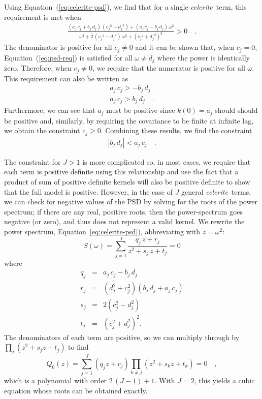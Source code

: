 \documentclass[manuscript, letterpaper]{aastex6}
\newcommand{\celeriteterm}{\emph{celerite}}
\renewcommand{\eqref}[1]{\ref{eq:#1}}
\newcommand{\Eq}[1]{Equation~(\eqref{#1})}
\newcommand{\eq}[1]{\Eq{#1}}
\newcommand{\eqalt}[1]{Equation~\eqref{#1}}
\newcommand{\eqlabel}[1]{\label{eq:#1}}
\newcommand{\response}[1]{{\color{blue}#1}}
\begin{document}
Using \eq{celerite-psd}, we find that for a single \celeriteterm\ term, this
requirement is met when
\begin{eqnarray}\eqlabel{psd-req}
\frac{(a_j\,c_j+b_j\,d_j)\,({c_j}^2+{d_j}^2)+(a_j\,c_j-b_j\,d_j)\,\omega^2}
{\omega^4+2\,({c_j}^2-{d_j}^2)\,\omega^2+{({c_j}^2+{d_j}^2)}^2} > 0 \quad.
\end{eqnarray}
The denominator is positive for all $c_j \ne 0$ and it can be shown that, when
$c_j=0$, \eq{psd-req} is satisfied for all $\omega \ne d_j$ where the power is
identically zero.
Therefore, when $c_j \ne 0$, we require that the numerator is positive for all
$\omega$.
This requirement can also be written as
\begin{eqnarray}
a_j\,c_j > -b_j\,d_j \\
a_j\,c_j > b_j\,d_j \quad.
\end{eqnarray}
Furthermore, we can see that $a_j$ must be positive since $k(0) = a_j$ should
should be positive and, similarly, by requiring the covariance to be finite at
infinite lag, we obtain the constraint $c_j \ge 0$.
Combining these results, we find the constraint
\begin{eqnarray}
    |b_j\,d_j| < a_j\,c_j \quad.
\end{eqnarray}

\response{The constraint for $J > 1$ is more complicated so, in most cases, we
require that each term is positive definite using this relationship and use
the fact that a product of sum of positive definite kernels will also be
positive definite \citep{Rasmussen:2006} to show that the full model is
positive.}
However, in the case of $J$ general \celeriteterm\ terms, we can check for
negative values of the PSD by solving for the roots of the power spectrum;
if there are any real, positive roots, then the power-spectrum goes negative
(or zero), and thus does not represent a valid kernel.
We rewrite the power spectrum, \eqalt{celerite-psd}), abbreviating with
$z = \omega^2$:
\begin{equation}
S(\omega)=  \sum_{j=1}^J \frac{q_j\,z + r_j}{z^2+s_j\,z + t_j} = 0
\end{equation}
where
\begin{eqnarray}
q_j &=& a_j\,c_j-b_j\,d_j\\
r_j &=& (d_j^2+c_j^2)(b_j\,d_j+a_j\,c_j)\\
s_j &=& 2(c_j^2-d_j^2)\\
t_j &=& (c_j^2+d_j^2)^2.
\end{eqnarray}
The denominators of each term are positive, so we can multiply through by
$\prod_j \left(z^2+s_jz + t_j\right)$ to find
\begin{equation}
Q_0(z) = \sum_{j=1}^J (q_j z + r_j)\prod_{k \ne j}\left(z^2+s_kz +
    t_k\right) = 0\quad,
\end{equation}
which is a polynomial with order $2\,(J-1)+1$.
With $J=2$, this yields a cubic equation whose roots can be obtained exactly.
\end{document}

